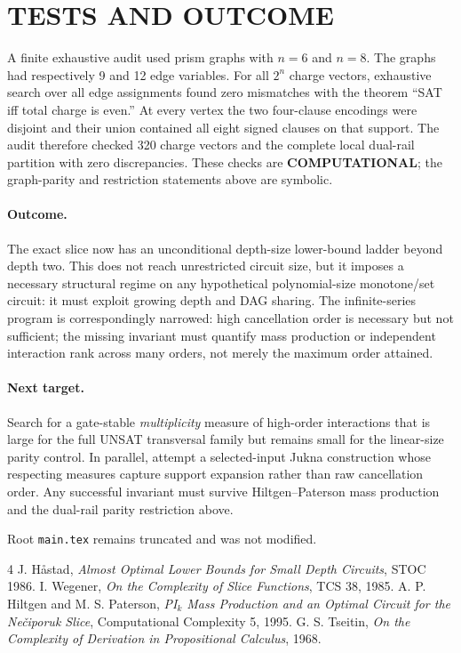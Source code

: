 \documentclass[11pt]{article}
\newcommand{\COMP}{\textbf{COMPUTATIONAL}}
\begin{document}
\section{TESTS AND OUTCOME}
A finite exhaustive audit used prism graphs with $n=6$ and $n=8$. The graphs had respectively 9 and 12 edge variables. For all $2^n$ charge vectors, exhaustive search over all edge assignments found zero mismatches with the theorem ``SAT iff total charge is even.'' At every vertex the two four-clause encodings were disjoint and their union contained all eight signed clauses on that support. The audit therefore checked 320 charge vectors and the complete local dual-rail partition with zero discrepancies. These checks are \COMP; the graph-parity and restriction statements above are symbolic.

\paragraph{Outcome.}
The exact slice now has an unconditional depth-size lower-bound ladder beyond depth two. This does not reach unrestricted circuit size, but it imposes a necessary structural regime on any hypothetical polynomial-size monotone/set circuit: it must exploit growing depth and DAG sharing. The infinite-series program is correspondingly narrowed: high cancellation order is necessary but not sufficient; the missing invariant must quantify mass production or independent interaction rank across many orders, not merely the maximum order attained.

\paragraph{Next target.}
Search for a gate-stable \emph{multiplicity} measure of high-order interactions that is large for the full UNSAT transversal family but remains small for the linear-size parity control. In parallel, attempt a selected-input Jukna construction whose respecting measures capture support expansion rather than raw cancellation order. Any successful invariant must survive Hiltgen--Paterson mass production and the dual-rail parity restriction above.

Root \texttt{main.tex} remains truncated and was not modified.

\begin{thebibliography}{4}
 J. H\aa stad, \emph{Almost Optimal Lower Bounds for Small Depth Circuits}, STOC 1986.
 I. Wegener, \emph{On the Complexity of Slice Functions}, TCS 38, 1985.
 A. P. Hiltgen and M. S. Paterson, \emph{PI$_k$ Mass Production and an Optimal Circuit for the Ne\v{c}iporuk Slice}, Computational Complexity 5, 1995.
 G. S. Tseitin, \emph{On the Complexity of Derivation in Propositional Calculus}, 1968.
\end{thebibliography}
\end{document}
